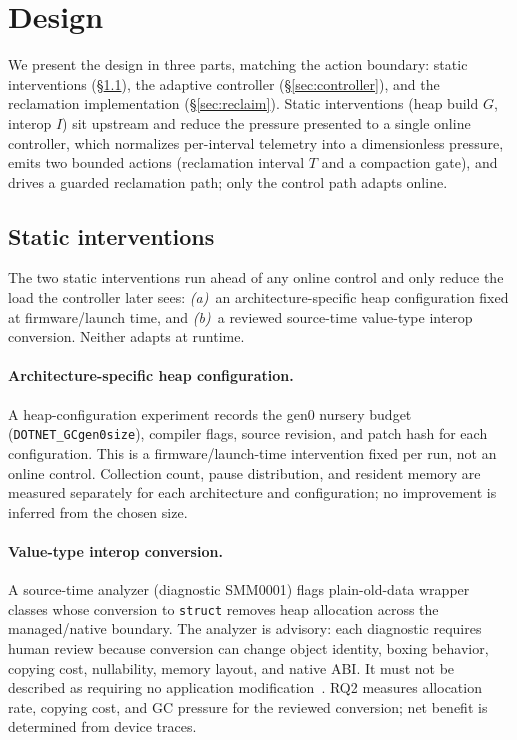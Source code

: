 \section{Design}
\label{sec:design}

We present the design in three parts, matching the action boundary:
static interventions (\S\ref{sec:static}), the adaptive controller
(\S\ref{sec:controller}), and the reclamation implementation
(\S\ref{sec:reclaim}). Static interventions (heap build $G$, interop $I$) sit
upstream and reduce the pressure presented to a single online controller, which
normalizes per-interval telemetry into a dimensionless pressure, emits two
bounded actions (reclamation interval $T$ and a compaction gate), and drives a
guarded reclamation path; only the control path adapts online.

\subsection{Static interventions}
\label{sec:static}

The two static interventions run ahead of any online control and only reduce the
load the controller later sees: \emph{(a)}~an architecture-specific heap
configuration fixed at firmware/launch time, and \emph{(b)}~a reviewed
source-time value-type interop conversion. Neither adapts at runtime.

\paragraph{Architecture-specific heap configuration.}
A heap-configuration experiment records the gen0 nursery budget
(\texttt{DOTNET\_GCgen0size}), compiler flags, source revision, and patch hash
for each configuration. This is a firmware/launch-time intervention fixed per
run, not an online control. Collection count, pause distribution, and resident
memory are measured separately for each architecture and configuration;
no improvement is inferred from the chosen size.

\paragraph{Value-type interop conversion.}
A source-time analyzer (diagnostic \textsf{SMM0001}) flags plain-old-data
wrapper classes whose conversion to \texttt{struct} removes heap allocation
across the managed/native boundary. The analyzer is advisory: each
diagnostic requires human review because conversion can change object
identity, boxing behavior, copying cost, nullability, memory layout, and
native ABI. It must not be described as requiring no application
modification~\cite{xlang2018}. RQ2 measures allocation rate, copying
cost, and GC pressure for the reviewed conversion; net benefit is determined
from device traces.

